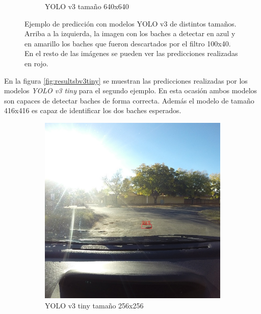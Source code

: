 \begin{figure}[H]
\begin{subfigure}[h]{0.45\linewidth}
		\caption{YOLO v3 tamaño 640x640}
	\end{subfigure}
	\caption{Ejemplo de predicción con modelos YOLO v3 de distintos tamaños. Arriba a la izquierda, la imagen con los baches a detectar en azul y en amarillo los baches que fueron descartados por el filtro 100x40. En el resto de las imágenes se pueden ver las predicciones realizadas en rojo.}
	\label{fig:resultsbv3}
\end{figure}

En la figura \ref{fig:resultsbv3tiny} se muestran las predicciones realizadas por los modelos \textit{YOLO v3 tiny} para el segundo ejemplo. En esta ocasión ambos modelos son capaces de detectar baches de forma correcta. Además el modelo de tamaño 416x416 es capaz de identificar los dos baches esperados.

\begin{figure}[H]
	\centering
	\begin{subfigure}[h]{0.45\linewidth}
		\includegraphics[width=\linewidth]{images/results_b_yolo_v3_tiny_256.jpg}
		\caption{YOLO v3 tiny tamaño 256x256}
	\end{subfigure}
	\begin{subfigure}[h]{0.45\linewidth}

\end{subfigure}
\end{figure}
